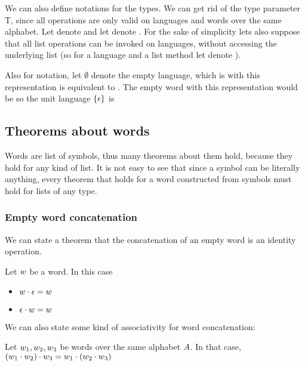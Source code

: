 We can also define notations for the types. We can get rid of the type parameter T, since all operations are only valid on languages and words over the same alphabet. Let  denote  and let  denote . For the sake of simplicity lets also suppose that all list operations can be invoked on languages, without accessing the underlying list (so for a language  and a list method  let  denote ).

Also for notation, let $\emptyset$ denote the empty language, which is with this representation is equivalent to . The empty word with this representation would be  so the unit language $\{\epsilon\}$ is 

\subsection{Theorems about words}

Words are list of symbols, thus many theorems about them hold, because they hold for any kind of list. It is not easy to see that since a symbol can be literally anything, every theorem that holds for a word constructed from symbols must hold for lists of any type.

\subsubsection{Empty word concatenation}

We can state a theorem that the concatenation of an empty word is an identity operation.

\begin{theorem}
	\label{the:emptyword}
	Let $w$ be a word. In this case 
	\begin{itemize}
		\item $w \cdot \epsilon = w$
		\item $\epsilon \cdot w = w$
	\end{itemize}
\end{theorem}

We can also state some kind of associativity for word concatenation:

\begin{theorem}
	Let $w_{1}, w_{2}, w_{3}$ be words over the same alphabet $A$. In that case, $(w_{1} \cdot w_{2}) \cdot w_{3} = w_{1} \cdot (w_{2} \cdot w_{3})$ 
\end{theorem}

